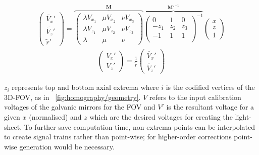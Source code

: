 \begin{align}
  \begin{pmatrix}
  \widetilde{V_x}'\\
  \widetilde{V_z}' \\
  \widetilde{r}'
  \end{pmatrix}
  =\overbrace{
  \begin{pmatrix}
  \lambda V_{x_1} & \mu V_{x_2} & \nu V_{x_3} \\
  \lambda V_{z_1} & \mu V_{z_2} & \nu V_{z_3} \\
  \lambda & \mu & \nu
\end{pmatrix}}^{\textbf{M}}
  \overbrace{
  \begin{pmatrix}
      0 & 1 & 0 \\
      -z_1 & z_2 & z_3 \\
      -1 & 1 & 1 \\
    \end{pmatrix}^{-1}}^{\textbf{M}'^{-1}}
  \begin{pmatrix}
  x\\
  z \\
  1
  \end{pmatrix}\nonumber
\end{align}
  \begin{align}
  \begin{pmatrix}
    V_x'\\
    V_z'
  \end{pmatrix} = \frac{1}{\widetilde{r}}
  \begin{pmatrix}
  \widetilde{V_x}'\\
  \widetilde{V_z}'
  \end{pmatrix}
\end{align}

$z_i$ represents top and bottom axial extrema where \(i\) is the codified vertices of the \gls{3D}-\gls{FOV}, as in \figurename~\ref{fig:homography/geometry}.
$V$ refers to the input calibration voltages of the galvanic mirrors for the \gls{FOV} and $V'$ is the resultant voltage for a given $x$ (normalised) and $z$ which are the desired voltages for creating the  \gls{light-sheet}.
To further save computation time,
non-extrema points can be interpolated to create signal trains rather than point-wise; for higher-order corrections point-wise generation would be necessary.

